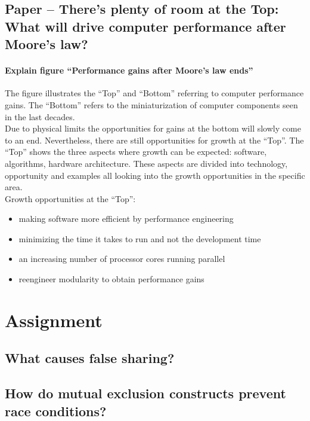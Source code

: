 \documentclass[runningheads]{llncs}
\begin{document}

\subsection {Paper – There’s plenty of room at the Top: What will drive computer performance after Moore’s law?}

\paragraph{Explain figure “Performance gains after Moore’s law ends”}
The figure illustrates the “Top” and “Bottom” referring to computer performance gains. The “Bottom” refers to the miniaturization of computer components seen in the last decades. \\
Due to physical limits the opportunities for gains at the bottom will slowly come to an end. Nevertheless, there are still opportunities for growth at the “Top”. The “Top” shows the three aspects where growth can be expected: software, algorithms, hardware architecture. These aspects are divided into technology, opportunity and examples all looking into the growth opportunities in the specific area.
\\
Growth opportunities at the “Top”:
\begin{itemize}
	\item making software more efficient by performance engineering
	\item minimizing the time it takes to run and not the development time
	\item an increasing number of processor cores running parallel
	\item reengineer modularity to obtain performance gains
\end{itemize}


\section{Assignment}

\subsection{What causes false sharing?}

\subsection{How do mutual exclusion constructs prevent race conditions?}
\end{document}
